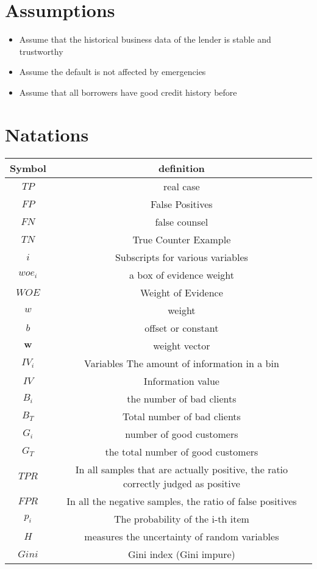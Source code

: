 \documentclass{mcmthesis}
\begin{document}
\section{Assumptions}
\begin{itemize}
\item Assume that the historical business data of the lender is stable and trustworthy
\item Assume the default is not affected by emergencies
\item Assume that all borrowers have good credit history before
\end{itemize}

\section{Natations}
\begin{tabular}{cc}
\toprule
Symbol & definition\\
\hline
$TP$ & real case \\
\hline
$FP$ & False Positives\\
\hline
$FN$ & false counsel\\
\hline
$TN$ & True Counter Example\\
\hline
$i$ & Subscripts for various variables \\
\hline
$woe_i$ & a box of evidence weight \\
\hline
$WOE$ & Weight of Evidence \\
\hline
$w$ & weight \\
\hline
$b$ & offset or constant \\
\hline
$\mathbf{w}$ & weight vector \\
\hline
$IV_i$ & Variables The amount of information in a bin \\
\hline
$IV$ & Information value \\
\hline
$B_i$ & the number of bad clients \\
\hline
$B_T$ & Total number of bad clients \\
\hline
$G_i$ & number of good customers \\
\hline
$G_T$ & the total number of good customers \\
\hline
$TPR$ & In all samples that are actually positive, the ratio correctly judged as positive\\
\hline
$FPR$ & In all the negative samples, the ratio of false positives\\
\hline
$p_i$ & The probability of the i-th item\\
\hline
$H$ & measures the uncertainty of random variables\\
\hline
$Gini$ & Gini index (Gini impure)\\
\hline
\end{tabular}
\end{document}
